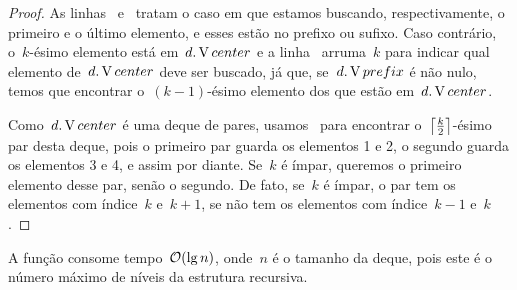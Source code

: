 \documentclass[main.tex]{subfiles}
\begin{document}
\begin{proof}
As linhas~ e~ tratam o caso em que estamos buscando, respectivamente, o primeiro e o último elemento, e esses estão no prefixo ou sufixo. Caso contrário, o~$k$-ésimo elemento está em~$d.\V{center}$ e a linha~ arruma~$k$ para indicar qual elemento de~$d.\V{center}$ deve ser buscado, já que, se~$d.\V{prefix}$ é não nulo, temos que encontrar o~$(k-1)$-ésimo elemento dos que estão em~$d.\V{center}$.

Como~$d.\V{center}$ é uma deque de pares, usamos~ para encontrar o~$\ceil*{\frac{k}{2}}$-ésimo par desta deque, pois o primeiro par guarda os elementos 1 e 2, o segundo guarda os elementos 3 e 4, e assim por diante. Se~$k$ é ímpar, queremos o primeiro elemento desse par, senão o segundo. De fato, se~$k$ é ímpar, o par tem os elementos com índice~$k$ e~$k+1$, se não tem os elementos com índice~$k-1$ e~$k$.
\end{proof}

A função consome tempo~$\Oh(\lg n)$, onde~$n$ é o tamanho da deque, pois este é o número máximo de níveis da estrutura recursiva.
\end{document}
